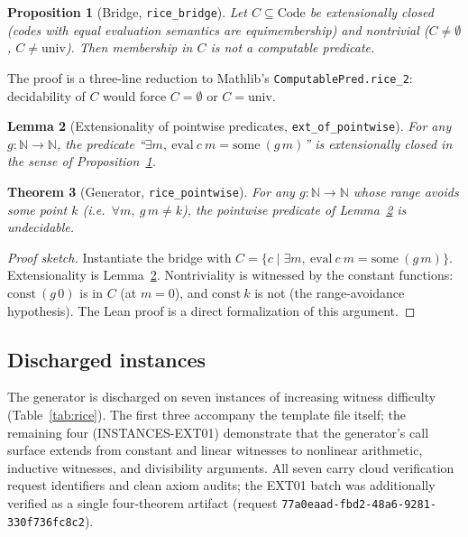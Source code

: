 \documentclass[11pt]{article}
\newtheorem{theorem}{Theorem}[section]
\newtheorem{proposition}[theorem]{Proposition}
\newtheorem{lemma}[theorem]{Lemma}
\theoremstyle{definition}
\theoremstyle{remark}
\newcommand{\rid}[1]{\texttt{#1}}
\newcommand{\lean}[1]{\texttt{#1}}
\begin{document}
\begin{proposition}[Bridge, \lean{rice\_bridge}]\label{prop:bridge}
Let $C\subseteq \mathrm{Code}$ be extensionally closed (codes with equal
evaluation semantics are equimembership) and nontrivial
($C\neq\emptyset$, $C\neq\mathrm{univ}$). Then membership in $C$ is not a
computable predicate.
\end{proposition}

The proof is a three-line reduction to Mathlib's \lean{ComputablePred.rice\_2}:
decidability of $C$ would force $C=\emptyset$ or $C=\mathrm{univ}$.

\begin{lemma}[Extensionality of pointwise predicates, \lean{ext\_of\_pointwise}]
\label{lem:ext}
For any $g:\mathbb{N}\to\mathbb{N}$, the predicate
``$\exists m,\ \mathrm{eval}\ c\ m = \mathrm{some}\ (g\,m)$'' is
extensionally closed in the sense of Proposition~\ref{prop:bridge}.
\end{lemma}

\begin{theorem}[Generator, \lean{rice\_pointwise}]\label{thm:gen}
For any $g:\mathbb{N}\to\mathbb{N}$ whose range avoids some point $k$
(i.e.\ $\forall m,\ g\,m\neq k$), the pointwise predicate of
Lemma~\ref{lem:ext} is undecidable.
\end{theorem}

\begin{proof}[Proof sketch]
Instantiate the bridge with $C=\{c \mid \exists m,\ \mathrm{eval}\ c\
m=\mathrm{some}\ (g\,m)\}$. Extensionality is Lemma~\ref{lem:ext}.
Nontriviality is witnessed by the constant functions: $\mathrm{const}\ (g\,0)$
is in $C$ (at $m=0$), and $\mathrm{const}\ k$ is not (the range-avoidance
hypothesis). The Lean proof is a direct formalization of this argument.
\end{proof}

\subsection{Discharged instances}

The generator is discharged on seven instances of increasing witness
difficulty (Table~\ref{tab:rice}). The first three accompany the template
file itself; the remaining four (INSTANCES-EXT01) demonstrate that the
generator's call surface extends from constant and linear witnesses to
nonlinear arithmetic, inductive witnesses, and divisibility arguments. All
seven carry cloud verification request identifiers and clean axiom audits;
the EXT01 batch was additionally verified as a single four-theorem artifact
(request \rid{77a0eaad-fbd2-48a6-9281-330f736fc8c2}).
\end{document}
